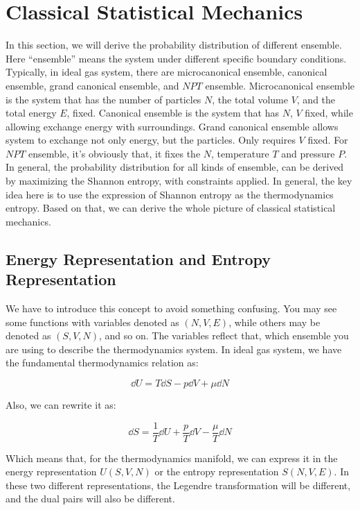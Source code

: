 \documentclass[../main.tex]{subfiles}
\begin{document}
\section{\textbf{Classical Statistical Mechanics}}

In this section, we will derive the probability distribution of different ensemble. Here ``ensemble'' means the system under different specific boundary conditions. Typically, in ideal gas system, there are  microcanonical ensemble, canonical ensemble, grand canonical ensemble, and $NPT$ ensemble. Microcanonical ensemble is the system that has the number of particles $N$, the total volume $V$, and the total energy $E$, fixed. Canonical ensemble is the system that has $N$, $V$ fixed, while allowing exchange energy with surroundings. Grand canonical ensemble allows system to exchange not only energy, but the particles. Only requires $V$ fixed. For $NPT$ ensemble, it's obviously that, it fixes the $N$, temperature $T$ and pressure $P$. In general, the probability distribution for all kinds of ensemble, can be derived by maximizing the Shannon entropy, with constraints applied. In general, the key idea here is to use the expression of Shannon entropy as the thermodynamics entropy. Based on that, we can derive the whole picture of classical statistical mechanics.

\subsection{Energy Representation and Entropy Representation}

We have to introduce this concept to avoid something confusing. You may see some functions with variables denoted as $(N, V, E)$, while others may be denoted as $(S, V, N)$, and so on. The variables reflect that, which ensemble you are using to describe the thermodynamics system.  In ideal gas system, we have the fundamental thermodynamics relation as:

\begin{equation}
    \dd{U} = T\dd{S} - p\dd{V} + \mu \dd{N}
\end{equation}

Also, we can rewrite it as:

\begin{equation}
    \dd{S} = \frac{1}{T}\dd{U} + \frac{p}{T} \dd{V} - \frac{\mu}{T}\dd{N}
\end{equation}

Which means that, for the thermodynamics manifold, we can express it in the energy representation $U(S, V, N)$ or the entropy representation $S(N, V, E)$. In these two different representations, the Legendre transformation will be different, and the dual pairs will also be different.
\end{document}
